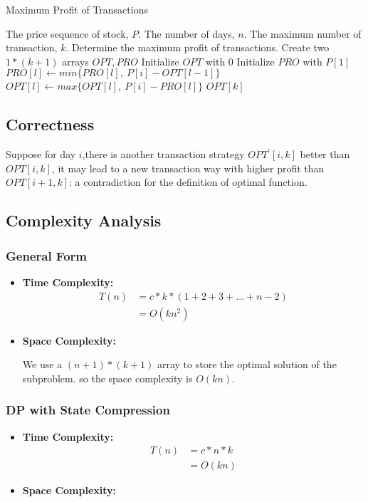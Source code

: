\documentclass[UTF8,a4paper,12pt]{article}
\begin{document}
\begin{CJK}{UTF8}{gkai}
	\begin{algorithm}[htb]
		\caption{Maximum Profit of Transactions}
		\begin{algorithmic}[1]
			\Require
				The price sequence of stock, $ P $.
				The number of days, $ n $.
				The maximum number of transaction, $k$.
			\Ensure
				Determine the maximum profit of transactions.
				\State Create two $ 1*(k+1) $ arrays $ OPT,PRO $
				\State Initialize $ OPT $  with 0
				\State Initialize $ PRO $ with $ P[1] $
						\State $ PRO[l] \gets min\{PRO[l],\ P[i]-OPT[l-1]\} $
						\State $ OPT[l] \gets max\{OPT[l],\ P[i]-PRO[l]\}$
					\EndFor				
				\EndFor
				\State \Return $ OPT[k] $
			\EndFunction
		\end{algorithmic}
	\end{algorithm}

	\subsection{Correctness}
	
		Suppose for day $ i $,there is another transaction strategy $ OPT^{'}[i,k] $ better than $ OPT[i,k] $, it may lead to a new transaction way with higher profit than $ OPT[i+1,k] $: a contradiction for the definition of optimal function.
	
	\subsection{Complexity Analysis}
	\subsubsection{General Form}
		\begin{itemize}
			\item{\textbf{Time Complexity:}} 
			\begin{align*}
			T(n) &= c*k*(1+2+3+\dots+n-2)\\
				&=O(kn^{2})
			\end{align*}
			\item{\textbf{Space Complexity:}}
			
			\setlength{\parindent}{2em}We use a $ (n+1)*(k+1) $ array to store the optimal solution of the subproblem. so the space complexity is $ O(kn) $.
			
		\end{itemize}
	\subsubsection{DP with State Compression}
		\begin{itemize}
			\item{\textbf{Time Complexity:}} 
			\begin{align*}
			T(n) &= c*n*k\\
			&=O(kn)
			\end{align*}
			\item{\textbf{Space Complexity:}}
			

\end{itemize}
\end{CJK}
\end{document}
